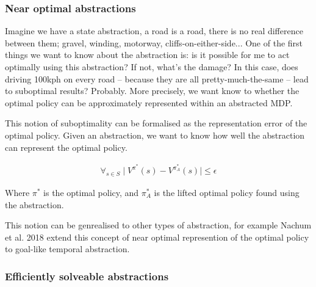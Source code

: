 \subsubsection{Near optimal abstractions}

Imagine we have a state abstraction, a road is a road, there is no real difference
between them; gravel, winding, motorway, cliffs-on-either-side...
One of the first things we want to know about the abstraction is:
is it possible for me to act optimally
using this abstraction? If not, what's the damage? In this case, does driving 100kph on every road --
because they are all pretty-much-the-same -- lead to suboptimal results? Probably.
More precisely, we want know to whether the optimal policy can be approximately represented within an abstracted MDP.

This notion of suboptimality can be formalised as the representation error of the optimal
policy. \cite{Abel2017} Given an abstraction, we want to know how well the abstraction can represent the optimal policy.

\begin{align}
\forall_{s\in S} \mid V^{\pi^* }(s) - V^{\pi_{A}^* }(s) \mid \le \epsilon
\end{align}

Where $\pi^{* }$ is the optimal policy, and $\pi_{A}^{* }$ is the lifted optimal
policy found using the abstraction.

This notion can be genrealised to other types of abstraction, for example
Nachum et al. 2018 \cite{Nachum2018} extend this concept of near optimal
represention of the optimal policy to goal-like temporal abstraction. \footnotemark[13]


\subsubsection{Efficiently solveable abstractions}


